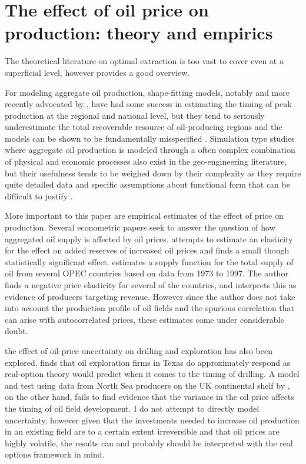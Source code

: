 \documentclass[12pt]{article}
\begin{document}
\section{The effect of oil price on production: theory and empirics}
The theoretical literature on optimal extraction is too vast to cover even at a superficial level, however \citet{krautkraemer_nonrenewable_1998} provides a good overview.

For modeling aggregate oil production, shape-fitting models, notably \citet{hubbert_energy_1962} and more recently advocated by \citet{deffeyes_hubberts_2001}, have had some success in estimating the timing of peak production at the regional and national level, but they tend to seriously underestimate the total recoverable resource of oil-producing regions and the models can be shown to be fundamentally misspecified \citep{boyce_prediction_2013}.   Simulation type studies where aggregate oil production is modeled through a often complex combination of physical and economic processes also exist in the geo-engineering literature, but their usefulness tends to be weighed down by their complexity as they require quite detailed data and specific assumptions about functional form that can be difficult to justify \citet{brandt_review_2010}.

More important to this paper are empirical estimates of the effect of price on production. Several econometric papers seek to answer the question of how aggregated oil supply is affected by oil prices.  \citet{farzin_impact_2001} attempts to estimate an elasticity for the effect on added reserves of increased oil prices and finds a small though statistically significant effect.  \citet{ramcharran_oil_2002} estimates a supply function for the total supply of oil from several OPEC countries based on data from 1973 to 1997.  The author finds a negative price elasticity for several of the countries, and interprets this as evidence of producers targeting revenue.  However since the author does not take into account the production profile of oil fields and the spurious correlation that can arise with autocorrelated prices, these estimates come under considerable doubt.  

the effect of oil-price uncertainty on drilling and exploration has also been explored.  \citet{kellogg_effect_2010} finds that oil exploration firms in Texas do approximately respond as real-option theory would predict when it comes to the timing of drilling.  A model and test using data from North Sea producers on the UK continental shelf by \citet{hurn_geology_1994}, on the other hand, fails to find evidence that the variance in the oil price affects the timing of oil field development.  I do not attempt to directly model uncertainty, however given that the investments needed to increase oil production in an existing field are to a certain extent irreversible and that oil prices are highly volatile, the results can and probably should be interpreted with the real options framework in mind.  
\end{document}

